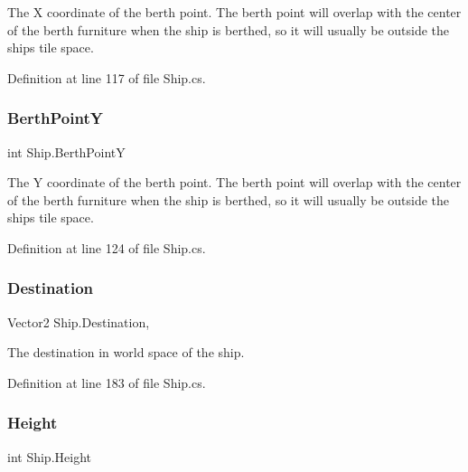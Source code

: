 The X coordinate of the berth point. The berth point will overlap with the center of the berth furniture when the ship is berthed, so it will usually be outside the ship\textquotesingle{}s tile space. 



Definition at line 117 of file Ship.\+cs.

\mbox{\label{class_ship_af57117a07b57f2b6764fd12e678f01ae}} 
\subsubsection{\texorpdfstring{Berth\+PointY}{BerthPointY}}
{\footnotesize\ttfamily int Ship.\+Berth\+PointY\hspace{0.3cm}{\ttfamily [get]}}



The Y coordinate of the berth point. The berth point will overlap with the center of the berth furniture when the ship is berthed, so it will usually be outside the ship\textquotesingle{}s tile space. 



Definition at line 124 of file Ship.\+cs.

\mbox{\label{class_ship_a799006d584ee78be4656c149a60babde}} 
\subsubsection{\texorpdfstring{Destination}{Destination}}
{\footnotesize\ttfamily Vector2 Ship.\+Destination\hspace{0.3cm}{\ttfamily [get]}, {\ttfamily [set]}}



The destination in world space of the ship. 



Definition at line 183 of file Ship.\+cs.

\mbox{\label{class_ship_a5812d27ab513c99d41b7d232aa3bdd6d}} 
\subsubsection{\texorpdfstring{Height}{Height}}
{\footnotesize\ttfamily int Ship.\+Height\hspace{0.3cm}{\ttfamily [get]}}



